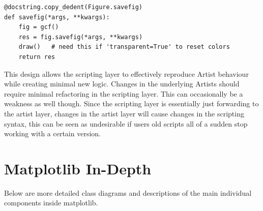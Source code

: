 \documentclass[pdftex,10pt,a4paper]{report}
\begin{document}
\begin{lstlisting}
@docstring.copy_dedent(Figure.savefig)
def savefig(*args, **kwargs):
	fig = gcf()
	res = fig.savefig(*args, **kwargs)
	draw()   # need this if 'transparent=True' to reset colors
	return res
\end{lstlisting}

This design allows the scripting layer to effectively reproduce Artist behaviour while creating minimal new logic. Changes in the underlying Artists should require minimal refactoring in the scripting layer. This can occasionally be a weakness as well though. Since the scripting layer is essentially just forwarding to the artist layer, changes in the artist layer will cause changes in the scripting syntax, this can be seen as undesirable if users old scripts all of a sudden stop working with a certain version.

\chapter{Matplotlib In-Depth}

Below are more detailed class diagrams and descriptions of the main individual components inside matplotlib. 

\end{document}
